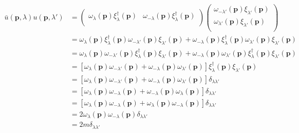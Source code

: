\begin{equation}
    \begin{aligned}
        \bar{u}\left( \mathbf{p},\lambda \right) u\left( \mathbf{p},\lambda \prime \right) &=\left( \begin{matrix}
	\omega _{\lambda}\left( \mathbf{p} \right) \xi _{\lambda}^{\dagger}\left( \mathbf{p} \right)&		\omega _{-\lambda}\left( \mathbf{p} \right) \xi _{\lambda}^{\dagger}\left( \mathbf{p} \right)\\
\end{matrix} \right) \left( \begin{array}{c}
	\omega _{-\lambda \prime}\left( \mathbf{p} \right) \xi _{\lambda \prime}\left( \mathbf{p} \right)\\
	\omega _{\lambda \prime}\left( \mathbf{p} \right) \xi _{\lambda \prime}\left( \mathbf{p} \right)\\
\end{array} \right) 
\\
&=\omega _{\lambda}\left( \mathbf{p} \right) \xi _{\lambda}^{\dagger}\left( \mathbf{p} \right) \omega _{-\lambda \prime}\left( \mathbf{p} \right) \xi _{\lambda \prime}\left( \mathbf{p} \right) +\omega _{-\lambda}\left( \mathbf{p} \right) \xi _{\lambda}^{\dagger}\left( \mathbf{p} \right) \omega _{\lambda \prime}\left( \mathbf{p} \right) \xi _{\lambda \prime}\left( \mathbf{p} \right) 
\\
&=\omega _{\lambda}\left( \mathbf{p} \right) \omega _{-\lambda \prime}\left( \mathbf{p} \right) \xi _{\lambda}^{\dagger}\left( \mathbf{p} \right) \xi _{\lambda \prime}\left( \mathbf{p} \right) +\omega _{-\lambda}\left( \mathbf{p} \right) \omega _{\lambda \prime}\left( \mathbf{p} \right) \xi _{\lambda}^{\dagger}\left( \mathbf{p} \right) \xi _{\lambda \prime}\left( \mathbf{p} \right) 
\\
&=\left[ \omega _{\lambda}\left( \mathbf{p} \right) \omega _{-\lambda \prime}\left( \mathbf{p} \right) +\omega _{-\lambda}\left( \mathbf{p} \right) \omega _{\lambda \prime}\left( \mathbf{p} \right) \right] \xi _{\lambda}^{\dagger}\left( \mathbf{p} \right) \xi _{\lambda \prime}\left( \mathbf{p} \right) 
\\
&=\left[ \omega _{\lambda}\left( \mathbf{p} \right) \omega _{-\lambda \prime}\left( \mathbf{p} \right) +\omega _{-\lambda}\left( \mathbf{p} \right) \omega _{\lambda \prime}\left( \mathbf{p} \right) \right] \delta _{\lambda \lambda \prime}
\\
&=\left[ \omega _{\lambda}\left( \mathbf{p} \right) \omega _{-\lambda}\left( \mathbf{p} \right) +\omega _{-\lambda}\left( \mathbf{p} \right) \omega _{\lambda}\left( \mathbf{p} \right) \right] \delta _{\lambda \lambda \prime}
\\
&=\left[ \omega _{\lambda}\left( \mathbf{p} \right) \omega _{-\lambda}\left( \mathbf{p} \right) +\omega _{\lambda}\left( \mathbf{p} \right) \omega _{-\lambda}\left( \mathbf{p} \right) \right] \delta _{\lambda \lambda \prime}
\\
&=2\omega _{\lambda}\left( \mathbf{p} \right) \omega _{-\lambda}\left( \mathbf{p} \right) \delta _{\lambda \lambda \prime}
\\
&=2m\delta _{\lambda \lambda \prime}
    \end{aligned}
\end{equation}
